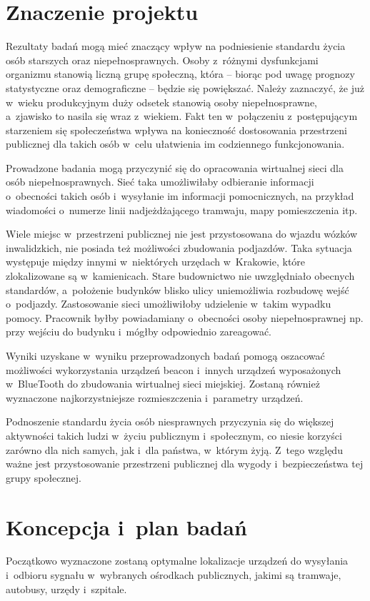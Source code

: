 \documentclass[a4paper]{article}
\begin{document}
\section{Znaczenie projektu}
Rezultaty badań mogą mieć znaczący wpływ na podniesienie standardu życia osób starszych oraz niepełnosprawnych. Osoby z~różnymi dysfunkcjami organizmu stanowią liczną grupę społeczną, która -- biorąc pod uwagę prognozy statystyczne oraz demograficzne -- będzie się powiększać. Należy zaznaczyć, że już w~wieku produkcyjnym duży odsetek stanowią osoby niepełnosprawne, a~zjawisko to nasila się wraz z~wiekiem. Fakt ten w~połączeniu z~postępującym starzeniem się społeczeństwa wpływa na konieczność dostosowania przestrzeni publicznej dla takich osób w~celu ułatwienia im codziennego funkcjonowania. 

Prowadzone badania mogą przyczynić się do opracowania wirtualnej sieci dla osób niepełnosprawnych. Sieć taka umożliwiłaby odbieranie informacji o~obecności takich osób i~wysyłanie im informacji pomocnicznych, na przykład wiadomości o~numerze linii nadjeżdżającego tramwaju, mapy pomieszczenia itp. 

Wiele miejsc w~przestrzeni publicznej nie jest przystosowana do wjazdu wózków inwalidzkich, nie posiada też możliwości zbudowania podjazdów. Taka sytuacja występuje między innymi w~niektórych urzędach w~Krakowie, które zlokalizowane są w~kamienicach. Stare budownictwo nie uwzględniało obecnych standardów, a~położenie budynków blisko ulicy uniemożliwia rozbudowę wejść o~podjazdy. Zastosowanie sieci umożliwiłoby udzielenie w~takim wypadku pomocy. Pracownik byłby powiadamiany o~obecności osoby niepełnosprawnej np. przy wejściu do budynku i~mógłby odpowiednio zareagować.

Wyniki uzyskane w~wyniku przeprowadzonych badań pomogą oszacować możliwości wykorzystania urządzeń beacon i~innych urządzeń wyposażonych w~BlueTooth do zbudowania wirtualnej sieci miejskiej. Zostaną również wyznaczone najkorzystniejsze rozmieszczenia i~parametry urządzeń.

Podnoszenie standardu życia osób niesprawnych przyczynia się do większej aktywności takich ludzi w~życiu publicznym i~społecznym, co niesie korzyści zarówno dla nich samych, jak i~dla państwa, w~którym żyją. Z~tego względu ważne jest przystosowanie przestrzeni publicznej dla wygody i~bezpieczeństwa tej grupy społecznej.

\section{Koncepcja i~plan badań}
Początkowo wyznaczone zostaną optymalne lokalizacje urządzeń do wysyłania i~odbioru sygnału w~wybranych ośrodkach publicznych, jakimi są tramwaje, autobusy, urzędy i~szpitale. 
\end{document}
